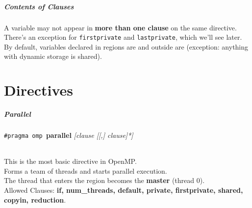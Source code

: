 \documentclass[aspectratio=43]{beamer}
\newenvironment{changemargin}[1]{%
  \begin{list}{}{%
    \setlength{\topsep}{0pt}%
    \setlength{\leftmargin}{#1}%
    \setlength{\rightmargin}{1em}
    \setlength{\listparindent}{\parindent}%
    \setlength{\itemindent}{\parindent}%
    \setlength{\parsep}{\parskip}%
  }%
  \item[]}{\end{list}}
\begin{document}
\begin{frame}
  \frametitle{Contents of Clauses}

  \begin{changemargin}{2.5cm}
    A variable may not appear in {\bf more than one clause} on the same
      directive.\\[1em]
    There's an exception for {\tt firstprivate} and {\tt lastprivate}, which we'll
      see later.\\[1em]
    By default, variables declared in regions are  and
      outside are  (exception: anything with dynamic
      storage is shared).
  \end{changemargin}

\end{frame}

\part{Directives}
\frame{\partpage}
\begin{frame}
  \frametitle{Parallel}

  \begin{changemargin}{2.5cm}
  \begin{center}
    {\tt \#pragma omp }{\bf parallel} {\it [clause [[,] clause]*]}
  \end{center}~\\
    This is the most basic directive in OpenMP.\\[1em]
    Forms a team of threads and starts parallel execution.\\[1em]
    The thread that enters the region becomes the {\bf master} (thread 0).\\[2em]
  Allowed Clauses: {\bf if, num\_threads, default, private, firstprivate,
    shared, copyin, reduction}.
  \end{changemargin}
\end{frame}
\end{document}
